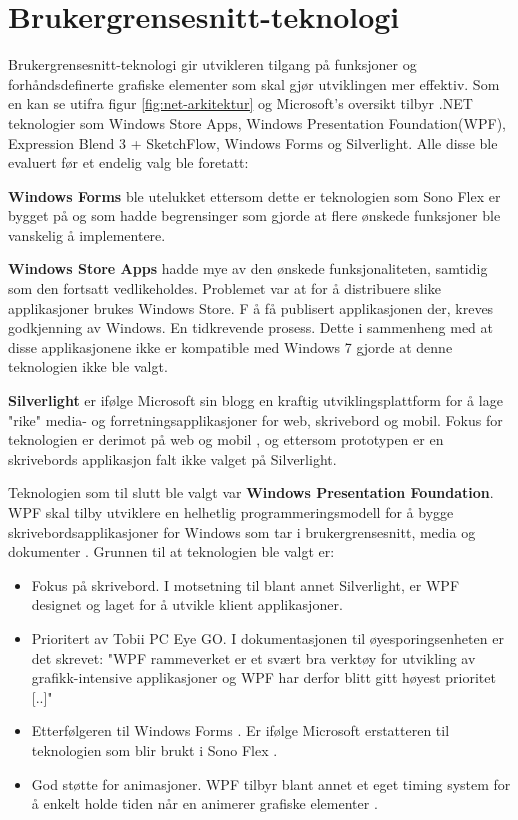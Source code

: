  
\section{Brukergrensesnitt-teknologi} 

Brukergrensesnitt-teknologi gir utvikleren tilgang på funksjoner og forhåndsdefinerte grafiske elementer som skal gjør utviklingen mer effektiv. Som en kan se utifra figur \ref{fig:net-arkitektur} og Microsoft's oversikt \cite{User1111:online} tilbyr .NET teknologier som Windows Store Apps, Windows Presentation Foundation(\gls{WPF}), Expression Blend 3 + SketchFlow, Windows Forms og Silverlight. Alle disse ble evaluert før et endelig valg ble foretatt:

\textbf{Windows Forms} ble utelukket ettersom dette er teknologien som Sono Flex er bygget på og som hadde begrensinger som gjorde at flere ønskede funksjoner ble vanskelig å implementere. 

\textbf{Windows Store Apps} hadde mye av den ønskede funksjonaliteten, samtidig som den fortsatt vedlikeholdes. Problemet var at for å distribuere slike applikasjoner brukes Windows Store. F å få publisert applikasjonen der, kreves godkjenning av Windows. En tidkrevende prosess. Dette i sammenheng med at disse applikasjonene ikke er kompatible med Windows 7\cite{Windo0:online} gjorde at denne teknologien ikke ble valgt. 

\textbf{Silverlight} er ifølge Microsoft sin blogg\cite{User1111:online} en kraftig utviklingsplattform for å lage "rike" media- og forretningsapplikasjoner for web, skrivebord og mobil. Fokus for teknologien er derimot på web og mobil \cite{Micro6:online}, og ettersom prototypen er en skrivebords applikasjon falt ikke valget på Silverlight.

Teknologien som til slutt ble valgt var \textbf{Windows Presentation Foundation}. WPF skal tilby utviklere en helhetlig programmeringsmodell for å bygge skrivebordsapplikasjoner for Windows som tar i brukergrensesnitt, media og dokumenter \cite{Windo777:online}. Grunnen til at teknologien ble valgt er:


\begin{itemize}
\item Fokus på skrivebord. I motsetning til blant annet Silverlight, er WPF designet og laget for å utvikle klient applikasjoner\cite{Windo777:online}.
\item Prioritert av Tobii PC Eye GO. I dokumentasjonen til øyesporingsenheten er det skrevet: "WPF  rammeverket er et svært bra verktøy for utvikling av grafikk-intensive applikasjoner og WPF har derfor blitt gitt høyest prioritet [..]"
\item Etterfølgeren til Windows Forms . Er ifølge Microsoft erstatteren til teknologien som blir brukt i Sono Flex \cite{User1111:online}. 
\item God støtte for animasjoner. WPF tilbyr blant annet et eget timing system for å enkelt holde tiden når en animerer grafiske elementer \cite{Anima7:online}.
\end{itemize}



